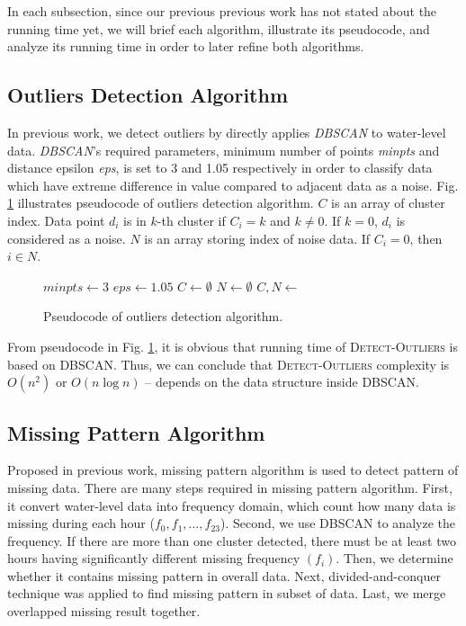 \documentclass[conference]{IEEEtran}
\begin{document}
In each subsection, since our previous previous work has not stated about the running time yet, we will brief each algorithm, illustrate its pseudocode, and analyze its running time in order to later refine both algorithms.

\subsection{Outliers Detection Algorithm}
In previous work, we detect outliers by directly applies \textit{DBSCAN} to water-level data. \textit{DBSCAN}'s required parameters, minimum number of points \textit{minpts} and distance epsilon \textit{eps}, is set to 3 and 1.05 respectively in order to classify data which have extreme difference in value compared to adjacent data as a noise. Fig. \ref{fig:outliers_pseudocode} illustrates pseudocode of outliers detection algorithm. $C$ is an array of cluster index. Data point $d_{i}$ is in $k$-th cluster if $C_{i} = k$ and $k \neq 0$. If $k = 0$, $d_{i}$ is considered as a noise. $N$ is an array storing index of noise data. If $C_{i} = 0$, then $i \in N$.

\begin{figure}
\begin{algorithmic}[1]
\State $minpts\gets3$
\State $eps\gets1.05 $
\State $C\gets\emptyset$
\State $N\gets\emptyset$
\State $C, N \gets $
\State {}
\EndProcedure
\end{algorithmic}
\caption{Pseudocode of outliers detection algorithm.}
\label{fig:outliers_pseudocode}
\end{figure}

From pseudocode in Fig. \ref{fig:outliers_pseudocode}, it is obvious that running time of \textsc{Detect-Outliers} is based on \textsc{DBSCAN}. Thus, we can conclude that \textsc{Detect-Outliers} complexity is $O(n^2)$ or $O(n\log{n})$ -- depends on the data structure inside \textsc{DBSCAN}.

\subsection{Missing Pattern Algorithm}

Proposed in previous work, missing pattern algorithm is used to detect pattern of missing data. There are many steps required in missing pattern algorithm. First, it convert water-level data into frequency domain, which count how many data is missing during each hour ($f_{0} ,f_{1}, \ldots, f_{23}$). Second, we use DBSCAN to analyze the frequency. If there are more than one cluster detected, there must be at least two hours having significantly different missing frequency $(f_{i})$. Then, we determine whether it contains missing pattern in overall data. Next, divided-and-conquer technique was applied to find missing pattern in subset of data. Last, we merge overlapped missing result together.
\end{document}
